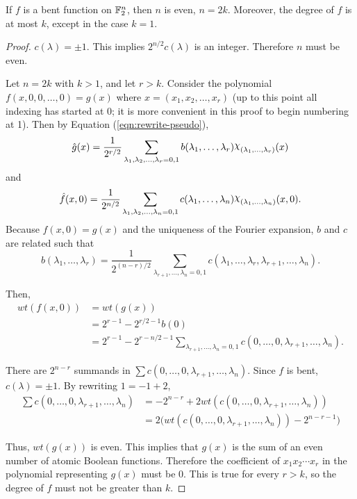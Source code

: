 \begin{theorem}{\rm \cite{art:r76}}\label{thm:deg-of-bent-function}
	If $f$ is a bent function on $\mathbb{F}_2^n$, then $n$ is even, $n=2k$.
  Moreover,
	the degree of $f$ is at most $k$, except in the case $k=1$.
\end{theorem}
\begin{proof}
  \par $c(\lambda)=\pm1$. This implies $2^{n/2}c(\lambda)$ is an
  integer. Therefore $n$ must be even.
  \par Let $n=2k$ with $k>1$, and let $r>k$. Consider the polynomial
  $f(x,\allowbreak 0,0,\dots,0)=\allowbreak g(x)$ where $x=(x_1,x_2,\dots,x_r)$
  (up to this point all indexing has
  started at 0; it is more convenient in this proof to begin numbering at
  1). Then by Equation (\ref{eqn:rewrite-pseudo}),
  \[
  \hat{g}(x)=\frac{1}{2^{r/2}}\sum_{\lambda_1,\lambda_2,\dots,\lambda_r=0,1}
    b(\lambda_1,\dots,\lambda_r)\Chi_{(\lambda_1,\ldots,\lambda_r)}(x)
  \]
  and
  \[
	\hat{f}(x,0)=\frac{1}{2^{n/2}}
    \sum_{\lambda_1,\lambda_2,\dots,\lambda_n=0,1}
    c(\lambda_1,\dots,\lambda_n)\Chi_{(\lambda_1,\ldots,\lambda_n)}(x,0).
  \]
  Because $f(x,0)=g(x)$ and the uniqueness of the Fourier expansion, $b$ and
  $c$ are related such that
  \[
  b(\lambda_1,\dots,\lambda_r)
    =\frac{1}{2^{(n-r)/2}}\sum_{\lambda_{r+1},\dots,\lambda_n=0,1}
    c(\lambda_1,\dots,\lambda_r,\lambda_{r+1},\dots,\lambda_n).
  \]
  \par Then,
  \begin{align*}
  wt(f(x,0))&=wt(g(x))\\
    &=2^{r-1}-2^{r/2-1}b(0)\\
    &=2^{r-1}-2^{r-n/2-1}\sum_{\lambda_{r+1},\dots,\lambda_n=0,1}
      c(0,\dots,0,\lambda_{r+1},\dots,\lambda_n).
  \end{align*}
  \par There are $2^{n-r}$ summands in
  $\sum{c(0,\dots,0,\lambda_{r+1},\dots,\lambda_n)}.$ Since $f$ is bent,
  $c(\lambda)=\pm1$. By rewriting $1=-1+2$,
  \begin{align*}
    \sum{c(0,\dots,0,\lambda_{r+1},\dots,\lambda_n)}
      &=-2^{n-r}+2wt(c(0,\dots,0,\lambda_{r+1},\dots,\lambda_n))\\
      &=2\big(wt(c(0,\dots,0,\lambda_{r+1},\dots,\lambda_n))-2^{n-r-1}\big)
  \end{align*}
  \par Thus, $wt(g(x))$ is even. This implies that $g(x)$ is the sum of an
  even number of atomic Boolean functions. Therefore the coefficient of
  $x_1x_2\cdots x_r$ in the polynomial representing $g(x)$ must be 0. This
  is true for every $r>k$, so the degree of $f$ must not be greater than
  $k$.
\end{proof}

